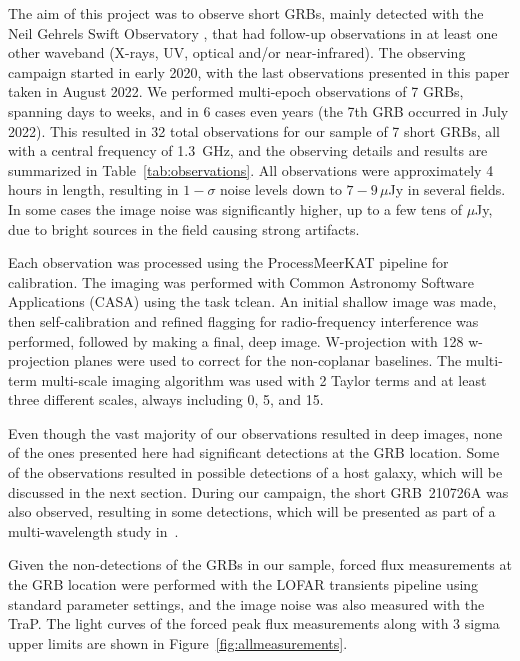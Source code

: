 \documentclass[12pt]{article}
\begin{document}
The aim of this project was to observe short GRBs, mainly detected with the Neil Gehrels Swift Observatory \citep{2004ApJ...611.1005G}, that had follow-up observations in at least one other waveband (X-rays, UV, optical and/or near-infrared). The observing campaign started in early 2020, with the last observations presented in this paper taken in August 2022. We performed multi-epoch observations of 7 GRBs, spanning days to weeks, and in 6 cases even years (the 7th GRB occurred in July 2022). This resulted in 32 total observations for our sample of 7 short GRBs, all with a central frequency of 1.3~GHz, and the observing details and results are summarized in Table~\ref{tab:observations}. All observations were approximately 4 hours in length, resulting in $1-\sigma$ noise levels down to $7-9\,\mu$Jy in several fields. In some cases the image noise was significantly higher, up to a few tens of $\mu$Jy, due to bright sources in the field causing strong artifacts.

Each observation was processed using the ProcessMeerKAT pipeline \citep{pminprep} for calibration. The imaging was performed with Common Astronomy Software Applications (CASA) \citep{2022arXiv221002276T} using the task tclean. An initial shallow image was made, then self-calibration and refined flagging for radio-frequency interference was performed, followed by making a final, deep image. W-projection with 128 w-projection planes were used to correct for the non-coplanar baselines. The multi-term multi-scale imaging algorithm was used with 2 Taylor terms and at least three different scales, always including 0, 5, and 15. 

Even though the vast majority of our observations resulted in deep images, none of the ones presented here had significant detections at the GRB location. Some of the observations resulted in possible detections of a host galaxy, which will be discussed in the next section. During our campaign, the short GRB~210726A was also observed, resulting in some detections, which will be presented as part of a multi-wavelength study in~\citep{grb210726ainprep}. 

Given the non-detections of the GRBs in our sample, forced flux measurements at the GRB location were performed with the LOFAR transients pipeline \citep[TraP;][]{2015A&C....11...25S} using standard parameter settings, and the image noise was also measured with the TraP. The light curves of the forced peak flux measurements along with 3 sigma upper limits are shown in Figure~\ref{fig:allmeasurements}. 
\end{document}
